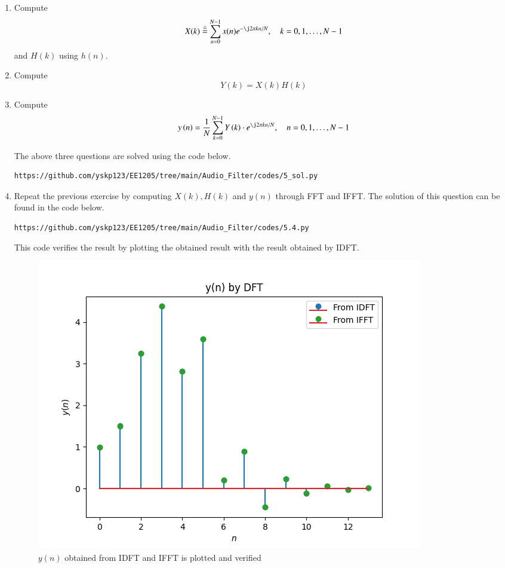 \documentclass[journal,12pt,twocolumn]{IEEEtran}
\newcommand{\define}{\stackrel{\triangle}{=}}
\theoremstyle{remark}
\begin{document}
\begin{enumerate}[label=\thesection.\arabic*]
\item
Compute
\begin{equation}
X(k) \define \sum _{n=0}^{N-1}x(n) e^{-\j2\pi kn/N}, \quad k = 0,1,\dots, N-1
\end{equation}
and $H(k)$ using $h(n)$.
\item Compute 
\begin{equation}
Y(k) = X(k)H(k)
\label{eq:fp}
\end{equation}
\item Compute
\begin{equation}
y\brak{n}={\frac {1}{N}}\sum _{k=0}^{N-1}Y\brak{k}\cdot e^{\j 2\pi kn/N},\quad n = 0,1,\dots, N-1
\label{eq:inv-ft}
\end{equation}

\solution The above three questions are solved using the code below.
\begin{lstlisting}
https://github.com/yskp123/EE1205/tree/main/Audio_Filter/codes/5_sol.py
\end{lstlisting}

\item Repeat the previous exercise by computing $X(k), H(k)$ and $y(n)$ through FFT and IFFT.
\solution The solution of this question can be found in the code below.
\begin{lstlisting}
https://github.com/yskp123/EE1205/tree/main/Audio_Filter/codes/5.4.py   
\end{lstlisting}
This code verifies the result by plotting the obtained result with the result obtained by IDFT.
\begin{figure}[H]
\centering
\includegraphics[width=\columnwidth]{figs/yn_verf_5.4.png}
\caption{$y(n)$ obtained from IDFT and IFFT is plotted and verified}
\label{fig:yn_verf_5.4}
\end{figure}


\end{enumerate}
\end{document}
